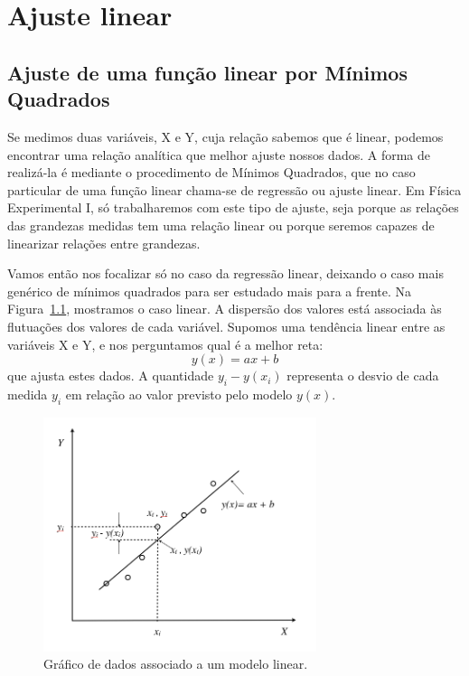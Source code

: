 \chapter{Ajuste linear}
\label{chap:minquad}
\section{Ajuste de uma função linear por Mínimos Quadrados}
\label{sec:minquad}


Se medimos duas variáveis, X e Y, cuja relação sabemos que é linear, podemos encontrar uma relação analítica que melhor ajuste nossos dados. A forma de realizá-la é mediante o procedimento de Mínimos Quadrados, que no caso particular de uma função linear chama-se de regressão ou ajuste linear. Em Física Experimental I, só trabalharemos com este tipo de ajuste, seja porque as relações das grandezas medidas tem uma relação linear ou porque seremos capazes de linearizar relações entre grandezas.

Vamos então nos focalizar só no caso da regressão linear, deixando o caso mais genérico de mínimos quadrados para ser estudado mais para a frente. Na Figura~\ref{fig:ajuste}, mostramos o caso linear. A dispersão dos valores está associada às flutuações dos valores de cada variável. Supomos uma tendência linear entre as variáveis X e Y, e nos perguntamos qual é a melhor reta: 
\begin{equation}
y(x) = a x + b
\end{equation}
\noindent
que ajusta estes dados. A quantidade $y_i - y(x_i)$ representa o desvio de cada medida $y_i$ em relação ao valor previsto pelo modelo $y(x)$.

\begin{figure}[h]
\begin{center}
\includegraphics[width=8cm]{fig/GraficoAjusteLin}
\vspace{-0.4cm}
\caption{\label{fig:ajuste} Gráfico de dados associado a um modelo linear.}
\vspace{-1.5cm}
\end{center}
\end{figure}

